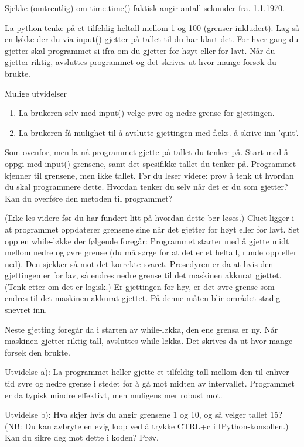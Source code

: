 \begin{exercise}
Sjekke (omtrentlig) om time.time() faktisk angir antall sekunder fra. 1.1.1970. 
\end{exercise}

\begin{exercise}
La python tenke på et tilfeldig heltall mellom 1 og 100 (grenser inkludert). 
Lag så en løkke der du via input() gjetter på tallet til du har klart det. 
For hver gang du gjetter skal programmet si ifra om du gjetter for høyt eller for lavt.
Når du gjetter riktig, avsluttes programmet og det skrives ut hvor mange forsøk du brukte. 

Mulige utvidelser
\begin{enumerate}
\item La brukeren selv med input() velge øvre og nedre grense for gjettingen.
\item La brukeren få mulighet til å avslutte gjettingen med f.eks. å skrive inn 'quit'.
\end{enumerate}
\end{exercise}

\begin{exercise}
Som ovenfor, men la nå programmet gjette på tallet du tenker på.
Start med å oppgi med input() grensene, samt det spesifikke tallet du tenker på.
Programmet kjenner til grensene, men ikke tallet.
Før du leser videre: prøv å tenk ut hvordan du skal programmere dette.
Hvordan tenker du selv når det er du som gjetter?
Kan du overføre den metoden til programmet?

(Ikke les videre før du har fundert litt på hvordan dette bør løses.) 
Cluet ligger i at programmet oppdaterer grensene sine når det gjetter for høyt
eller for lavt. 
Set opp en while-løkke der følgende foregår: 
Programmet starter med å gjette midt mellom nedre og øvre grense
(du må sørge for at det er et heltall, runde opp eller ned).
Den sjekker så mot det korrekte svaret. 
Prosedyren er da at hvis den gjettingen er for lav,
så endres nedre grense til det maskinen akkurat gjettet.
(Tenk etter om det er logisk.) 
Er gjettingen for høy, er det øvre grense som endres til det maskinen akkurat gjettet.
På denne måten blir området stadig snevret inn.

Neste gjetting foregår da i starten av while-løkka, den ene grensa er ny. 
Når maskinen gjetter riktig tall, avsluttes while-løkka.
Det skrives da ut hvor mange forsøk den brukte. 

Utvidelse a): La programmet heller gjette et tilfeldig tall mellom den til enhver tid
øvre og nedre grense i stedet for å gå mot midten av intervallet.
Programmet er da typisk mindre effektivt, men muligens mer robust mot.

Utvidelse b): Hva skjer hvis du angir grensene 1 og 10, og så velger tallet 15?
(NB: Du kan avbryte en evig loop ved å trykke CTRL+c i IPython-konsollen.) 
Kan du sikre deg mot dette i koden? Prøv. 
\end{exercise}

